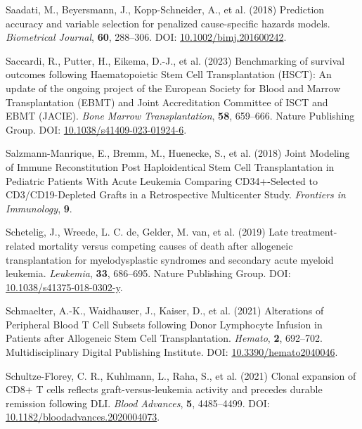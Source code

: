 \documentclass[
  letterpaper,
  DIV=11,
  numbers=noendperiod]{scrreprt}
\newlength{\cslhangindent}
\newlength{\cslentryspacingunit} %
\newenvironment{CSLReferences}[2] %
 {%
  \setlength{\parindent}{0pt}
  \ifodd #1
  \let\oldpar\par
  \def\par{\hangindent=\cslhangindent\oldpar}
  \fi
  \setlength{\parskip}{#2\cslentryspacingunit}
 }%
 {}
\begin{document}
\begin{CSLReferences}{1}{0}
\leavevmode{}%
Saadati, M., Beyersmann, J., Kopp-Schneider, A., et al. (2018)
Prediction accuracy and variable selection for penalized cause-specific
hazards models. \emph{Biometrical Journal}, \textbf{60}, 288--306. DOI:
\href{https://doi.org/10.1002/bimj.201600242}{10.1002/bimj.201600242}.

\leavevmode{}%
Saccardi, R., Putter, H., Eikema, D.-J., et al. (2023) Benchmarking of
survival outcomes following {Haematopoietic Stem Cell Transplantation}
({HSCT}): An update of the ongoing project of the {European Society} for
{Blood} and {Marrow Transplantation} ({EBMT}) and {Joint Accreditation
Committee} of {ISCT} and {EBMT} ({JACIE}). \emph{Bone Marrow
Transplantation}, \textbf{58}, 659--666. Nature Publishing Group. DOI:
\href{https://doi.org/10.1038/s41409-023-01924-6}{10.1038/s41409-023-01924-6}.

\leavevmode{}%
Salzmann-Manrique, E., Bremm, M., Huenecke, S., et al. (2018) Joint
{Modeling} of {Immune Reconstitution Post Haploidentical Stem Cell
Transplantation} in {Pediatric Patients With Acute Leukemia Comparing
CD34}+-{Selected} to {CD3}/{CD19-Depleted Grafts} in a {Retrospective
Multicenter Study}. \emph{Frontiers in Immunology}, \textbf{9}.

\leavevmode{}%
Schetelig, J., Wreede, L. C. de, Gelder, M. van, et al. (2019) Late
treatment-related mortality versus competing causes of death after
allogeneic transplantation for myelodysplastic syndromes and secondary
acute myeloid leukemia. \emph{Leukemia}, \textbf{33}, 686--695. Nature
Publishing Group. DOI:
\href{https://doi.org/10.1038/s41375-018-0302-y}{10.1038/s41375-018-0302-y}.

\leavevmode{}%
Schmaelter, A.-K., Waidhauser, J., Kaiser, D., et al. (2021) Alterations
of {Peripheral Blood T Cell Subsets} following {Donor Lymphocyte
Infusion} in {Patients} after {Allogeneic Stem Cell Transplantation}.
\emph{Hemato}, \textbf{2}, 692--702. Multidisciplinary Digital
Publishing Institute. DOI:
\href{https://doi.org/10.3390/hemato2040046}{10.3390/hemato2040046}.

\leavevmode{}%
Schultze-Florey, C. R., Kuhlmann, L., Raha, S., et al. (2021) Clonal
expansion of {CD8}+ {T} cells reflects graft-versus-leukemia activity
and precedes durable remission following {DLI}. \emph{Blood Advances},
\textbf{5}, 4485--4499. DOI:
\href{https://doi.org/10.1182/bloodadvances.2020004073}{10.1182/bloodadvances.2020004073}.


\end{CSLReferences}
\end{document}

